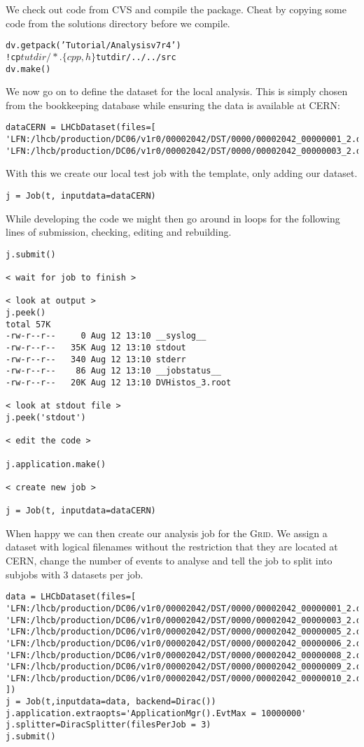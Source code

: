 \documentclass{howto}
\def\grid {\textsc{Grid}\xspace}
\def\tutorialv {v7r4\xspace}
\begin{document}
We check out code from CVS and compile the package. Cheat by copying some
code from the solutions directory before we compile.
\begin{alltt}
dv.getpack('Tutorial/Analysis \tutorialv')
!cp $tutdir/*.\{cpp,h\} $tutdir/../../src
dv.make()
\end{alltt}
We now go on to define the dataset for the local analysis. This is simply
chosen from the bookkeeping database while ensuring the data is available at
CERN:
\begin{verbatim}
dataCERN = LHCbDataset(files=[
'LFN:/lhcb/production/DC06/v1r0/00002042/DST/0000/00002042_00000001_2.dst',
'LFN:/lhcb/production/DC06/v1r0/00002042/DST/0000/00002042_00000003_2.dst'])
\end{verbatim}
With this we create our local test job with the template, only adding our
dataset.
\begin{verbatim}
j = Job(t, inputdata=dataCERN)
\end{verbatim}
While developing the code we might then go around in loops for the following
lines of submission, checking, editing and rebuilding.
\begin{verbatim}
j.submit()

< wait for job to finish >

< look at output >
j.peek()
total 57K
-rw-r--r--     0 Aug 12 13:10 __syslog__
-rw-r--r--   35K Aug 12 13:10 stdout
-rw-r--r--   340 Aug 12 13:10 stderr
-rw-r--r--    86 Aug 12 13:10 __jobstatus__
-rw-r--r--   20K Aug 12 13:10 DVHistos_3.root

< look at stdout file >
j.peek('stdout')

< edit the code >

j.application.make()

< create new job >

j = Job(t, inputdata=dataCERN)
\end{verbatim}
When happy we can then create our analysis job for the \grid. We assign a
dataset with logical filenames without the restriction that they are located
at CERN, change the number of events to analyse and tell the job to split into
subjobs with 3 datasets per job.
\begin{verbatim}
data = LHCbDataset(files=[
'LFN:/lhcb/production/DC06/v1r0/00002042/DST/0000/00002042_00000001_2.dst',
'LFN:/lhcb/production/DC06/v1r0/00002042/DST/0000/00002042_00000003_2.dst',
'LFN:/lhcb/production/DC06/v1r0/00002042/DST/0000/00002042_00000005_2.dst',
'LFN:/lhcb/production/DC06/v1r0/00002042/DST/0000/00002042_00000006_2.dst',
'LFN:/lhcb/production/DC06/v1r0/00002042/DST/0000/00002042_00000008_2.dst',
'LFN:/lhcb/production/DC06/v1r0/00002042/DST/0000/00002042_00000009_2.dst',
'LFN:/lhcb/production/DC06/v1r0/00002042/DST/0000/00002042_00000010_2.dst'
])
j = Job(t,inputdata=data, backend=Dirac())
j.application.extraopts='ApplicationMgr().EvtMax = 10000000'
j.splitter=DiracSplitter(filesPerJob = 3)
j.submit()
\end{verbatim}
\end{document}
